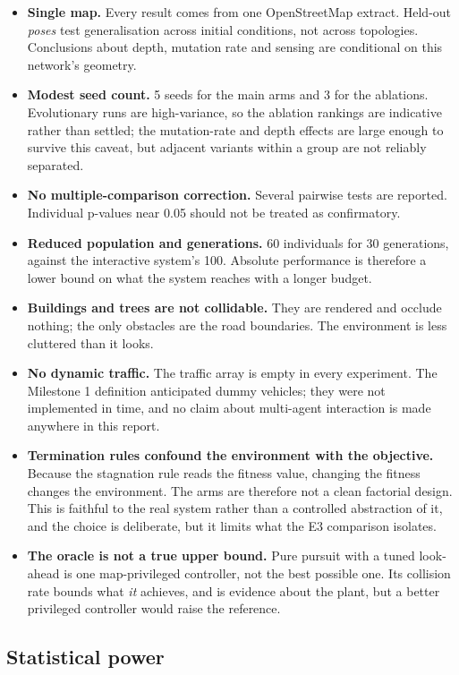 \documentclass[conference]{IEEEtran}
\begin{document}
\begin{itemize}
\item \textbf{Single map.} Every result comes from one OpenStreetMap extract. Held-out \emph{poses} test generalisation across initial conditions, not across topologies. Conclusions about depth, mutation rate and sensing are conditional on this network's geometry.
\item \textbf{Modest seed count.} 5 seeds for the main arms and 3 for the ablations. Evolutionary runs are high-variance, so the ablation rankings are indicative rather than settled; the mutation-rate and depth effects are large enough to survive this caveat, but adjacent variants within a group are not reliably separated.
\item \textbf{No multiple-comparison correction.} Several pairwise tests are reported. Individual p-values near 0.05 should not be treated as confirmatory.
\item \textbf{Reduced population and generations.} 60 individuals for 30 generations, against the interactive system's 100. Absolute performance is therefore a lower bound on what the system reaches with a longer budget.
\item \textbf{Buildings and trees are not collidable.} They are rendered and occlude nothing; the only obstacles are the road boundaries. The environment is less cluttered than it looks.
\item \textbf{No dynamic traffic.} The traffic array is empty in every experiment. The Milestone 1 definition anticipated dummy vehicles; they were not implemented in time, and no claim about multi-agent interaction is made anywhere in this report.
\item \textbf{Termination rules confound the environment with the objective.} Because the stagnation rule reads the fitness value, changing the fitness changes the environment. The arms are therefore not a clean factorial design. This is faithful to the real system rather than a controlled abstraction of it, and the choice is deliberate, but it limits what the E3 comparison isolates.
\item \textbf{The oracle is not a true upper bound.} Pure pursuit with a tuned look-ahead is one map-privileged controller, not the best possible one. Its collision rate bounds what \emph{it} achieves, and is evidence about the plant, but a better privileged controller would raise the reference.
\end{itemize}

\subsection{Statistical power}
\end{document}
